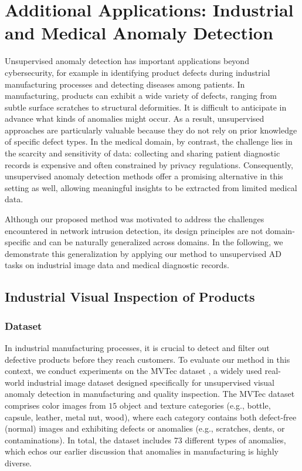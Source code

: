 \documentclass{article}
\begin{document}
\section{Additional Applications: Industrial and Medical Anomaly Detection}\label{section:add_exp}
Unsupervised anomaly detection has important applications beyond cybersecurity, for example in identifying product defects during industrial manufacturing processes and detecting diseases among patients. In manufacturing, products can exhibit a wide variety of defects, ranging from subtle surface scratches to structural deformities. It is difficult to anticipate in advance what kinds of anomalies might occur. As a result, unsupervised approaches are particularly valuable because they do not rely on prior knowledge of specific defect types. In the medical domain, by contrast, the challenge lies in the scarcity and sensitivity of data: collecting and sharing patient diagnostic records is expensive and often constrained by privacy regulations. Consequently, unsupervised anomaly detection methods offer a promising alternative in this setting as well, allowing meaningful insights to be extracted from limited medical data.

Although our proposed method was motivated to address the challenges encountered in network intrusion detection, its design principles are not domain-specific and can be naturally generalized across domains. In the following, we demonstrate this generalization by applying our method to unsupervised AD tasks on industrial image data and medical diagnostic records.

\subsection{Industrial Visual Inspection of Products}

\subsubsection{Dataset}
In industrial manufacturing processes, it is crucial to detect and filter out defective products before they reach customers. To evaluate our method in this context, we conduct experiments on the MVTec dataset \citep{bergmann2019mvtec}, a widely used real-world industrial image dataset designed specifically for unsupervised visual anomaly detection in manufacturing and quality inspection. The MVTec dataset comprises color images from $15$ object and texture categories (e.g., bottle, capsule, leather, metal nut, wood), where each category contains both defect-free (normal) images and exhibiting defects or anomalies (e.g., scratches, dents, or contaminations). In total, the dataset includes 73 different types of anomalies, which echos our earlier discussion that anomalies in manufacturing is highly diverse.
\end{document}
